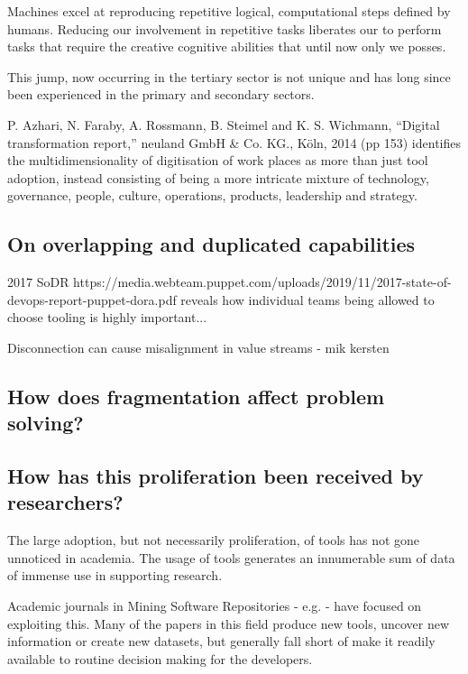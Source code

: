 Machines excel at reproducing repetitive logical, computational steps defined by humans. Reducing our involvement in repetitive tasks liberates our to perform tasks that require the creative cognitive abilities that until now only we posses.  

This jump, now occurring in the tertiary sector is not unique and has long since been experienced in the primary and secondary sectors. 


P. Azhari, N. Faraby, A. Rossmann, B. Steimel and K. S. Wichmann, “Digital transformation report,” neuland GmbH \& Co. KG., Köln, 2014 (pp 153) identifies the multidimensionality of digitisation of work places as more than just tool adoption, instead consisting of being a more intricate mixture of technology, governance, people, culture, operations, products, leadership and strategy.

\subsection{On overlapping and duplicated capabilities}


2017 SoDR https://media.webteam.puppet.com/uploads/2019/11/2017-state-of-devops-report-puppet-dora.pdf reveals how individual teams being allowed to choose tooling is highly important... 

Disconnection can cause misalignment in value streams - mik kersten

\subsection{How does fragmentation affect problem solving?}


\subsection{How has this proliferation been received by researchers?}

The large adoption, but not necessarily proliferation, of tools has not gone unnoticed in academia. The usage of tools generates an innumerable sum of data of immense use in supporting research.

Academic journals in Mining Software Repositories - e.g. \cite{Storey:2019:3341883} - have focused on exploiting this. Many of the papers in this field produce new tools, uncover new information or create new datasets, but generally fall short of make it readily available to routine decision making for the developers.

